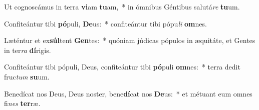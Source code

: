 \item Ut cognoscámus in terra \textbf{vi}am \textbf{tu}am,~* in ómnibus Géntibus salutá\textit{re} \textbf{tu}um.
\item Confiteántur tibi \textbf{pó}puli, \textbf{De}us:~* confiteántur tibi pópu\textit{li} \textbf{om}nes.
\item Læténtur et ex\textbf{súl}tent \textbf{Gen}tes:~* quóniam júdicas pópulos in æquitáte, et Gentes in ter\textit{ra} \textbf{dí}rigis.
\item Confiteántur tibi pópuli, Deus, confiteántur tibi \textbf{pó}puli \textbf{om}nes:~* terra dedit fruc\textit{tum} \textbf{su}um.
\item Benedícat nos Deus, Deus noster, bene\textbf{dí}cat nos \textbf{De}us:~* et métuant eum omnes fi\textit{nes} \textbf{ter}ræ.
